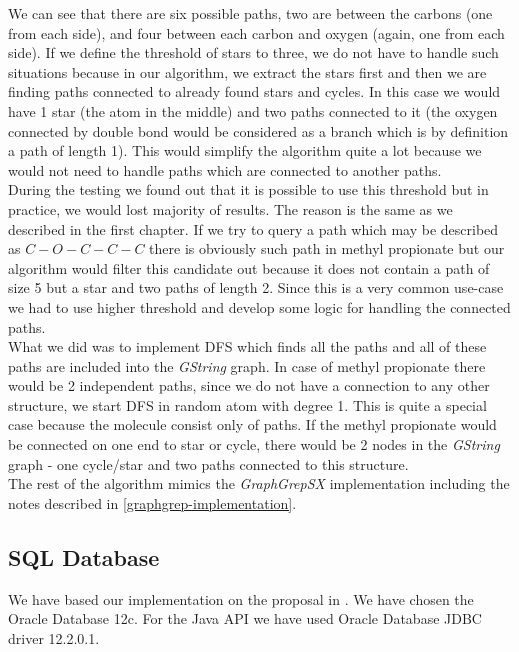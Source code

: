 {We can see that there are six possible paths, two are between the carbons (one from each side), and four between each carbon and oxygen (again, one from each side). If we define the threshold of stars to three, we do not have to handle such situations because in our algorithm, we extract the stars first and then we are finding paths connected to already found stars and cycles. In this case we would have 1 star (the atom in the middle) and two paths connected to it (the oxygen connected by double bond would be considered as a branch which is by definition a path of length 1). This would simplify the algorithm quite a lot because we would not need to handle paths which are connected to another paths.\\

During the testing we found out that it is possible to use this threshold but in practice, we would lost majority of results. The reason is the same as we described in the first chapter. If we try to query a path which may be described as $C-O-C-C-C$ there is obviously such path in methyl propionate but our algorithm would filter this candidate out because it does not contain a path of size 5 but a star and two paths of length 2. Since this is a very common use-case we had to use higher threshold and develop some logic for handling the connected paths.\\

What we did was to implement DFS which finds all the paths and all of these paths are included into the \textit{GString} graph. In case of methyl propionate there would be 2 independent paths, since we do not have a connection to any other structure, we start DFS in random atom with degree 1. This is quite a special case because the molecule consist only of paths. If the methyl propionate would be connected on one end to star or cycle, there would be 2 nodes in the \textit{GString} graph - one cycle/star and two paths connected to this structure.\\

The rest of the algorithm mimics the \textit{GraphGrepSX} implementation including the notes described in \ref{graphgrep-implementation}.

\subsection{SQL Database}

We have based our implementation on the proposal in \cite{SQL}. We have chosen the Oracle Database 12c. For the Java API we have used Oracle Database JDBC driver 12.2.0.1.\\

}

